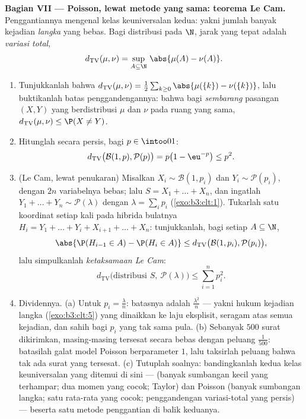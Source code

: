 \begin{problem}
\medskip
\noindent\textbf{Bagian VII --- Poisson, lewat metode yang sama:
teorema Le Cam.} Penggantiannya mengenal kelas keuniversalan kedua:
yakni jumlah banyak kejadian \emph{langka} yang bebas. Bagi
distribusi pada $\N$, jarak yang tepat adalah \emph{variasi total},
\[
d_{\mathrm{TV}}(\mu, \nu) = \sup_{A\subseteq\N}\,
\abs{\mu(A) - \nu(A)} .
\]
\begin{enumerate}[resume]
  \item Tunjukkanlah bahwa $d_{\mathrm{TV}}(\mu, \nu) =
        \frac12\sum_{k\geq0}\abs{\mu(\{k\}) -
        \nu(\{k\})}$, lalu buktikanlah batas penggandengannya: bahwa bagi
        \emph{sembarang} pasangan $(X, Y)$  yang
        berdistribusi $\mu$ dan $\nu$ pada ruang yang sama,
        $d_{\mathrm{TV}}(\mu, \nu) \leq \P(X \neq Y)$.
  \item Hitunglah secara persis, bagi $p \in \intoo01$:
        \[
        d_{\mathrm{TV}}\bigl(\mathcal B(1, p), \mathcal
        P(p)\bigr) = p\bigl(1 - \eu^{-p}\bigr) \leq p^2 .
        \]
  \item (Le Cam, lewat penukaran) Misalkan $X_i \sim \mathcal B(1,
        p_i)$ dan $Y_i \sim \mathcal P(p_i)$, dengan $2n$
        variabelnya bebas; lalu $S = X_1 + \dots + X_n$, dan
        ingatlah $Y_1 + \dots + Y_n \sim \mathcal P(\lambda)$
        dengan $\lambda = \sum_ip_i$ (\cref{exo:b3:clt:1}).
        Tukarlah satu koordinat setiap kali pada hibrida
        bulatnya $H_i = Y_1 + \dots + Y_i + X_{i+1} + \dots
        + X_n$: tunjukkanlah, bagi setiap $A \subseteq \N$,
        \[
        \abs{\P(H_{i-1} \in A) - \P(H_i \in A)} \leq
        d_{\mathrm{TV}}\bigl(\mathcal B(1, p_i), \mathcal
        P(p_i)\bigr),
        \]
        lalu simpulkanlah \emph{ketaksamaan Le Cam}:
        \[
        d_{\mathrm{TV}}\bigl(\text{distribusi } S,\ \mathcal
        P(\lambda)\bigr) \leq \sum_{i=1}^np_i^2 .
        \]
  \item Dividennya. (a) Untuk $p_i = \frac\lambda n$: batasnya
        adalah $\frac{\lambda^2}n$ --- yakni hukum kejadian
        langka (\cref{exo:b3:clt:5}) yang dinaikkan ke laju
        eksplisit, seragam atas semua kejadian, dan sahih
        bagi $p_i$ yang tak sama pula. (b) Sebanyak $500$ surat
        dikirimkan, masing-masing tersesat secara bebas dengan
        peluang $\frac1{500}$: batasilah galat model
        Poisson berparameter $1$, lalu taksirlah
        peluang bahwa tak ada surat yang tersesat. (c) Tutuplah
        soalnya: bandingkanlah kedua kelas keuniversalan
        yang ditemui di sini ---  (banyak sumbangan kecil yang
        terhampar; dua momen yang cocok; Taylor) dan
        Poisson (banyak sumbangan langka; satu rata-rata
        yang cocok; penggandengan variasi-total yang persis) --- beserta
        satu metode penggantian di balik keduanya.


\end{enumerate}
\end{problem}
